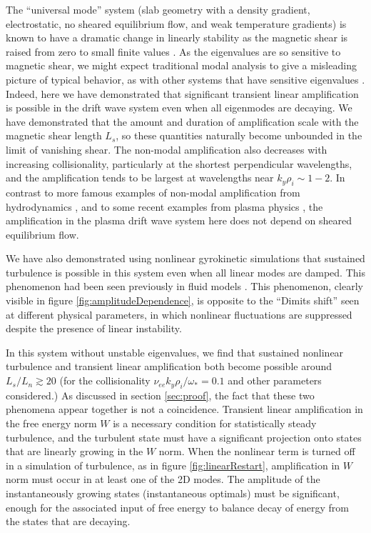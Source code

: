 \documentclass[12pt,superscriptaddress]{revtex4}
\begin{document}
The ``universal mode'' system (slab geometry with a density gradient, electrostatic,
no sheared equilibrium flow, and weak temperature gradients)
is known to have a dramatic change in linearly stability
as the magnetic shear is raised from zero to small finite values
\cite{Ross, Tsang, Antonsen,usUniversalInstability}.
As the eigenvalues are so sensitive to magnetic shear,
we might expect traditional modal analysis to
give a misleading picture of typical behavior,
as with other systems that have sensitive eigenvalues \cite{TrefethenEmbree}.
Indeed, here we have demonstrated that significant
transient linear amplification is possible in the drift wave system even when
all eigenmodes are decaying.
We have demonstrated that the amount and duration of amplification scale
with the magnetic shear length $L_s$, so these quantities naturally become
unbounded in the limit of vanishing shear.
The non-modal amplification also decreases with increasing collisionality,
particularly at the shortest perpendicular wavelengths,
and the amplification tends to be largest at wavelengths near $k_y \rho_i \sim 1-2$.
In contrast to more famous examples of non-modal amplification
from hydrodynamics \cite{TrefethenSubcritical}, and to some recent examples from plasma physics \cite{Newton, Alex, BarnesRotation, EdmundPRL},
the amplification in the plasma drift wave system here
does not depend on sheared equilibrium flow.

We have also demonstrated using nonlinear gyrokinetic simulations
that sustained turbulence is possible in this system
even when all linear modes are damped.
This phenomenon had been seen previously
in fluid models \cite{Scott1, Scott2, Drake}.
This phenomenon, clearly visible in figure \ref{fig:amplitudeDependence},
is opposite to the ``Dimits shift'' \cite{Dimits} seen at different physical parameters,
in which nonlinear fluctuations
are suppressed despite the presence of linear instability.

In this system without unstable eigenvalues, we find that sustained nonlinear turbulence
and transient linear amplification both become possible around $L_s / L_n \gtrsim 20$
(for the collisionality $\nu_{ee} k_y \rho_i / \omega_* = 0.1$ and other parameters considered.)
As discussed in section \ref{sec:proof}, the fact that these two phenomena appear together is not
a coincidence. Transient linear amplification in the free energy norm $W$ is a necessary condition for statistically steady
turbulence, and the turbulent state must have a significant projection onto states that are linearly growing in the $W$
norm.  When the nonlinear term is turned off in a simulation of turbulence, as in figure \ref{fig:linearRestart},
amplification in $W$ norm must occur in at least one of the 2D modes.
The amplitude of the instantaneously growing states (instantaneous optimals) must be
significant, enough for the associated input of free energy to balance decay of energy
from the states that are decaying.
\end{document}
